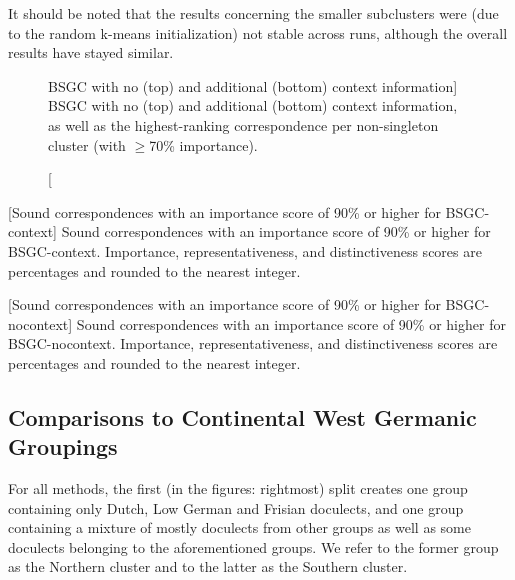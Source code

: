 \documentclass[a4paper]{article}
\begin{document}
It should be noted that the results concerning
the smaller subclusters were
(due to the random k-means initialization) not stable
across runs, although the overall results have stayed similar.

\begin{figure}[h]
\centering
% 


\vspace{2em}
 
% 

\caption
[BSGC with no (top) and additional (bottom) context information]
{BSGC with no (top) and additional (bottom) context information,
as well as the highest-ranking correspondence per non-singleton cluster
(with $\geq$70\% importance).}
\label{fig:bsgc-trees}
\end{figure}

\begin{table}[h]
\centering

[Sound correspondences with an importance score of 90\% or higher for BSGC-context]
{Sound correspondences with an importance score of 90\% or higher for BSGC-context.
Importance, representativeness, and distinctiveness scores are percentages
and rounded to the nearest integer.
}
\label{tab:bsgc-context-corres}
\end{table}

\begin{table}[h]
\centering

[Sound correspondences with an importance score of 90\% or higher for BSGC-nocontext]
{Sound correspondences with an importance score of 90\% or higher for BSGC-nocontext.
Importance, representativeness, and distinctiveness scores are percentages
and rounded to the nearest integer.
}
\label{tab:bsgc-nocontext-corres}
\end{table}

\subsection{Comparisons to Continental West Germanic Groupings}

For all methods, the first (in the figures: rightmost) split
creates one group containing only Dutch, Low German and Frisian doculects,
and one group containing a mixture of mostly doculects from other groups
as well as some doculects belonging to the aforementioned groups.
We refer to the former group as the Northern cluster and to the
latter as the Southern cluster.
\end{document}
